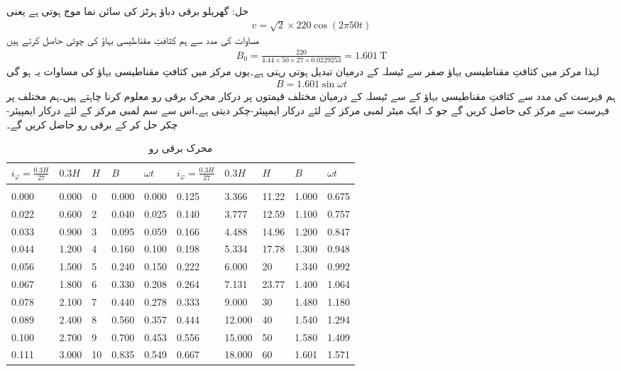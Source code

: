 حل:
	گھریلو برقی دباؤ  ہرٹز کی سائن نما موج ہوتی ہے یعنی
\begin{align}
v=\sqrt{2} \times 220 \cos (2 \pi  50 t)
\end{align}
مساوات   کی مدد سے ہم کثافتِ مقناطیسی بہاؤ کی چوٹی حاصل کرتے ہیں
\begin{align}
B_0=\frac{220}{4.44 \times 50 \times 27 \times 0.0229253}=\SI{1.601}{\tesla}
\end{align}
لہٰذا مرکز میں کثافتِ مقناطیسی بہاؤ صفر سے   ٹیسلہ کے درمیان تبدیل ہوتی رہتی ہے۔یوں مرکز میں کثافتِ مقناطیسی بہاؤ کی مساوات یہ ہو گی
\begin{align}\label{مساوات_مقناطیسی_دور_سائن_نما_کثافت_بہاو}
B=1.601 \sin \omega t
\end{align}
ہم فہرست کی مدد سے کثافتِ مقناطیسی بہاؤ کے   سے  ٹیسلہ کے درمیان مختلف قیمتوں پر درکار محرک برقی رو  معلوم کرنا چاہتے ہیں۔ہم مختلف  پر فہرست سے مرکز کی  حاصل کریں گے جو کہ ایک میٹر لمبی مرکز کے لئے درکار ایمپیئر-چکر دیتی ہے۔اس سے  سم لمبی مرکز کے لئے درکار ایمپیئر-چکر  حل کر کے برقی رو حاصل کریں گے۔

%
\begin{table}
\begin{tabular}{l l l l l | l l l l l}
$i_{\varphi}=\frac{0.3 H}{27}$&$0.3H$&$H$&$B$&$\omega t$&$i_{\varphi}=\frac{0.3 H}{27}$&$0.3H$&$H$&$B$&$\omega t$\\
\hline\\
0.000&0.000&0&0.000&0.000&0.125&3.366&11.22&1.000&0.675\\
0.022&0.600&2&0.040&0.025&0.140&3.777&12.59&1.100&0.757\\
0.033&0.900&3&0.095&0.059&0.166&4.488&14.96&1.200&0.847\\
0.044&1.200&4&0.160&0.100&0.198&5.334&17.78&1.300&0.948\\
0.056&1.500&5&0.240&0.150&0.222&6.000&20&1.340&0.992\\
0.067&1.800&6&0.330&0.208&0.264&7.131&23.77&1.400&1.064\\
0.078&2.100&7&0.440&0.278&0.333&9.000&30&1.480&1.180\\
0.089&2.400&8&0.560&0.357&0.444&12.000&40&1.540&1.294\\
0.100&2.700&9&0.700&0.453&0.556&15.000&50&1.580&1.409\\
0.111&3.000&10&0.835&0.549&0.667&18.000&60&1.601&1.571\\
\hline
\end{tabular}
\caption{محرک برقی رو}
\label{جدول_مقناطیسی_ادوار_محرک_برقی_رو_بالمقابل_کثافت_بہاو}
\end{table}


